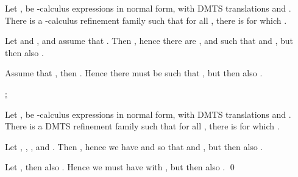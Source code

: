 \documentclass[twocolumn]{svjour3-dummy}
\begin{document}
  Let , 
  be -calculus expressions in normal form, with DMTS translations
   and .  There is a -calculus refinement
  family  such
  that for all , there is  for which .

  Let  and , and assume that
  .  Then , hence there
  are ,  and  such
  that  and , but then also .

  Assume that , then .  Hence
  there must be  such that , but then also
  .

  \medskip \noindent \underline{:}

  Let , 
  be -calculus expressions in normal form, with DMTS translations
   and .  There is a DMTS refinement family  such that for all
  , there is  for which .

  Let , , , and
  .  Then , hence we
  have  and  so that  and , but then
  also .

  Let , then also .  Hence we
  must have  with , but then also .  \qed
\end{document}
